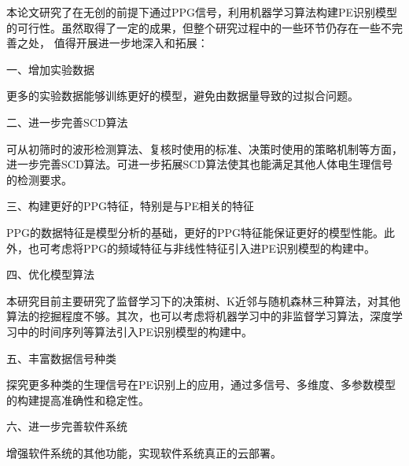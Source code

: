 本论文研究了在无创的前提下通过PPG信号，利用机器学习算法构建PE识别模型的可行性。虽然取得了一定的成果，但整个研究过程中的一些环节仍存在一些不完善之处，
值得开展进一步地深入和拓展：

一、增加实验数据

更多的实验数据能够训练更好的模型，避免由数据量导致的过拟合问题。

二、进一步完善SCD算法

可从初筛时的波形检测算法、复核时使用的标准、决策时使用的策略机制等方面，进一步完善SCD算法。可进一步拓展SCD算法使其也能满足其他人体电生理信号的检测要求。

三、构建更好的PPG特征，特别是与PE相关的特征

PPG的数据特征是模型分析的基础，更好的PPG特征能保证更好的模型性能。此外，也可考虑将PPG的频域特征与非线性特征引入进PE识别模型的构建中。

四、优化模型算法

本研究目前主要研究了监督学习下的决策树、K近邻与随机森林三种算法，对其他算法的挖掘程度不够。其次，也可以考虑将机器学习中的非监督学习算法，深度学习中的时间序列等算法引入PE识别模型的构建中。

五、丰富数据信号种类

探究更多种类的生理信号在PE识别上的应用，通过多信号、多维度、多参数模型的构建提高准确性和稳定性。

六、进一步完善软件系统

增强软件系统的其他功能，实现软件系统真正的云部署。
